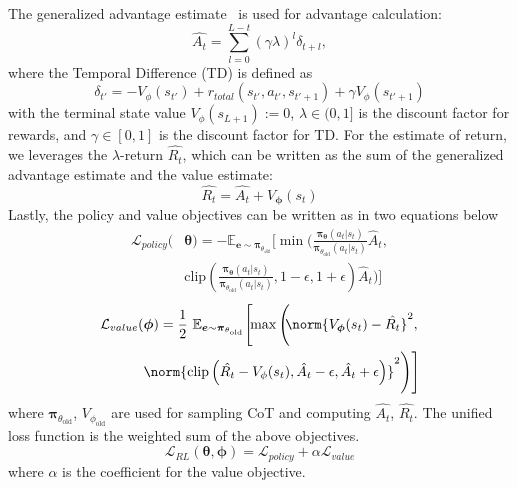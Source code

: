 The generalized advantage estimate~\cite{schulman2018highdimensional} is used for advantage calculation:
\begin{equation*}\label{eq:Advantage}
    \hat{A_t} = \sum_{l=0}^{L-t} (\gamma\lambda)^{l}\delta_{t+l},
\end{equation*}
where the Temporal Difference (TD) is defined as
\begin{equation*}
    \delta_{t'} = -V_{\phi}(s_{t'}) + r_{total}(s_{t'},a_{t'},s_{t'+1}) + \gamma V_{\phi}(s_{t'+1})
\end{equation*}
with the terminal state value $V_{\phi}(s_{L+1}) := 0$,
$\lambda \in (0,1]$ is the discount factor for rewards,
and $\gamma \in [0,1]$ is the discount factor for TD.
For the estimate of return, 
we leverages the $\lambda$-return $\hat{R_t}$, 
which can be written as the sum of the generalized advantage estimate and the value estimate:
\begin{equation*}
    \hat{R_t} = \hat{A_t} + V_{\boldsymbol{\phi}}(s_t)
\end{equation*}
Lastly, the policy and value objectives can be written as in two equations below
\begin{equation*}
\begin{split}
\mathcal{L}_{policy}(&\boldsymbol{\theta})  = -\mathbb{E_{\boldsymbol{e} \sim \boldsymbol{\pi}_{\theta_{\text{old}}}}}\Bigg[ \min \Bigg( \frac{\boldsymbol{\pi}_{\boldsymbol{\theta}} (a_t|s_t)}{\boldsymbol{\pi}_{\theta_{\text{old}}} (a_t|s_t)} \hat{A}_t, \\
&\text{clip}\left( \frac{\boldsymbol{\pi}_{\boldsymbol{\theta}} (a_t|s_t)}{\boldsymbol{\pi}_{\theta_{\text{old}}} (a_t|s_t)}, 1-\epsilon, 1+\epsilon \right) \hat{A}_t \Bigg) \Bigg]
\end{split}
\label{eq:loss_policy}
\end{equation*}
\begin{equation*}
\begin{split}
\mathcal{L}_{value}(&\boldsymbol{\phi})  = \frac{1}{2}~ \mathbb{E_{\boldsymbol{e} \sim \boldsymbol{\pi}_{\theta_{\text{old}}}}}\Bigg[
\!\! \max \Bigg(\!\! \norm{V_{\boldsymbol{\phi}}(s_t) - \hat{R_t}}^2, \\ 
&\norm{\text{clip}\left(\hat{R_t}-V_{\phi}(s_t), \hat{A_t} -\epsilon, \hat{A_t} + \epsilon \right)}^2 \Bigg) \Bigg]
\end{split}
\label{eq:loss_value}
\end{equation*}
where $\boldsymbol{\pi}_{\theta_{\text{old}}}$, $V_{\phi_{\text{old}}}$ are used for sampling CoT and computing $\hat{A_t}$, $\hat{R_t}$.
The unified loss function is the weighted sum of the above objectives.
\begin{equation}\label{eq:loss_rl}
    \mathcal{L}_{RL}(\boldsymbol{\theta}, \boldsymbol{\phi}) = \mathcal{L}_{policy} + \alpha \mathcal{L}_{value}
\end{equation}
where $\alpha$ is the coefficient for the value objective.

